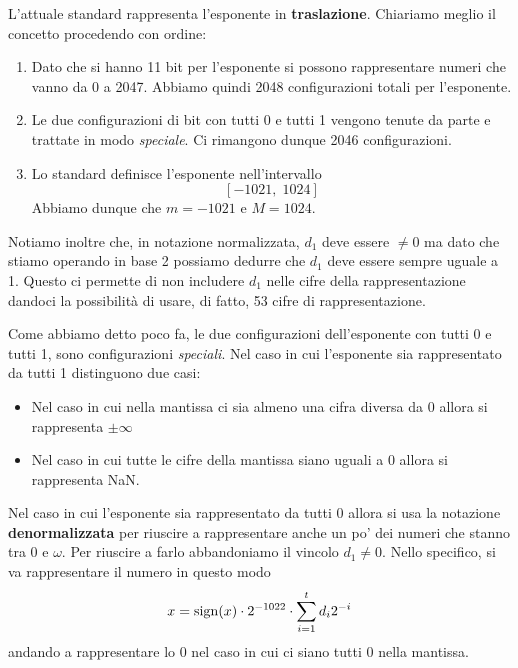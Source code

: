 L'attuale standard rappresenta l'esponente in \textbf{traslazione}. Chiariamo meglio
il concetto procedendo con ordine:
\begin{enumerate}
	\item Dato che si hanno 11 bit per l'esponente si possono rappresentare numeri che vanno da 0 a 2047. Abbiamo
	      quindi 2048 configurazioni totali per l'esponente.
	\item Le due configurazioni di bit con tutti 0 e tutti 1 vengono tenute da parte e trattate in modo
	      \emph{speciale}. Ci rimangono dunque 2046 configurazioni.
	\item Lo standard definisce l'esponente nell'intervallo
	      \[ [ -1021, \; 1024 ] \]
	      Abbiamo dunque che $m = -1021$ e $M = 1024$.
\end{enumerate}
Notiamo inoltre che, in notazione normalizzata, $d_1$ deve essere $\neq 0$ ma dato che stiamo operando in
base 2 possiamo dedurre che $d_1$ deve essere sempre uguale a 1. Questo ci permette di non includere $d_1$
nelle cifre della rappresentazione dandoci la possibilità di usare, di fatto, 53 cifre di rappresentazione.

Come abbiamo detto poco fa, le due configurazioni dell'esponente con tutti 0 e tutti 1, sono configurazioni
\emph{speciali}. Nel caso in cui l'esponente sia rappresentato da tutti 1 distinguono due casi:
\begin{itemize}
	\item Nel caso in cui nella mantissa ci sia almeno una cifra diversa da 0 allora si rappresenta
	      $\pm \infty$
	\item Nel caso in cui tutte le cifre della mantissa siano uguali a 0 allora si rappresenta NaN.
\end{itemize}
Nel caso in cui l'esponente sia rappresentato da tutti 0 allora si usa la notazione \textbf{denormalizzata}
per riuscire a rappresentare anche un po' dei numeri che stanno tra 0 e $\omega$. Per riuscire a farlo
abbandoniamo il vincolo $d_1 \neq 0$. Nello specifico, si va rappresentare il numero in questo modo
\[ x = \operatorname{sign}(x) \cdot 2^{-1022} \cdot \sum_{i=1}^t d_i 2^{-i} \]
andando a rappresentare lo 0 nel caso in cui ci siano tutti 0 nella mantissa.
